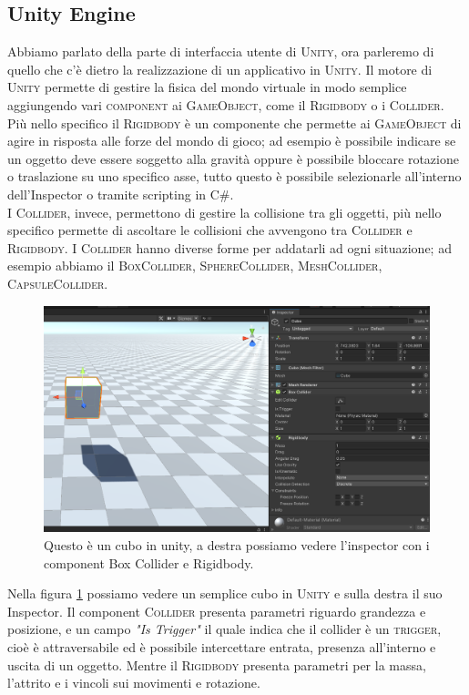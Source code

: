 \documentclass[12pt, openany]{book}
\begin{document}
	\subsection{Unity Engine}
	Abbiamo parlato della parte di interfaccia utente di \textsc{Unity}, ora parleremo di quello che c'è dietro la realizzazione di un applicativo in \textsc{Unity}.
	Il motore di \textsc{Unity} permette di gestire la fisica del mondo virtuale in modo semplice aggiungendo vari \textsc{component} ai \textsc{GameObject}, come il \textsc{Rigidbody} o i \textsc{Collider}. Più nello specifico il \textsc{Rigidbody} è un componente che permette ai \textsc{GameObject} di agire in risposta alle forze del mondo di gioco; ad esempio è possibile indicare se un oggetto deve essere soggetto alla gravità oppure è possibile bloccare rotazione o traslazione su uno specifico asse, tutto questo è possibile selezionarle all'interno dell'Inspector o tramite scripting in \textsc{C\#}.\\
	I \textsc{Collider}, invece, permettono di gestire la collisione tra gli oggetti, più nello specifico permette di ascoltare le collisioni che avvengono tra \textsc{Collider} e \textsc{Rigidbody}. I \textsc{Collider} hanno diverse forme per addatarli ad ogni situazione; ad esempio abbiamo il \textsc{BoxCollider}, \textsc{SphereCollider}, \textsc{MeshCollider}, \textsc{CapsuleCollider}.
	\begin{figure}[H]
		\centering
		\includegraphics[width=0.8\linewidth]{"Immagini/RigidBody.png"}
		\caption{Questo è un cubo in unity, a destra possiamo vedere l'inspector con i component Box Collider e Rigidbody.}
		\label{fig:Rigidbody}
	\end{figure}
	Nella figura \ref{fig:Rigidbody} possiamo vedere un semplice cubo in \textsc{Unity} e sulla destra il suo Inspector. Il component \textsc{Collider} presenta parametri riguardo grandezza e posizione, e un campo \emph{"Is Trigger"} il quale indica che il collider è un \textsc{trigger}, cioè è attraversabile ed è possibile intercettare entrata, presenza all'interno e uscita di un oggetto. Mentre il \textsc{Rigidbody} presenta parametri per la massa, l'attrito e i vincoli sui movimenti e rotazione.
\end{document}
